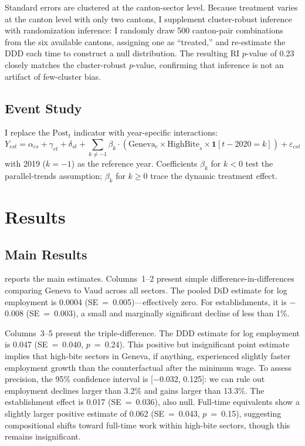 \documentclass[12pt]{article}
\begin{document}
Standard errors are clustered at the canton-sector level. Because treatment varies at the canton level with only two cantons, I supplement cluster-robust inference with randomization inference: I randomly draw 500 canton-pair combinations from the six available cantons, assigning one as ``treated,'' and re-estimate the DDD each time to construct a null distribution. The resulting RI $p$-value of 0.23 closely matches the cluster-robust $p$-value, confirming that inference is not an artifact of few-cluster bias.

\subsection{Event Study}

I replace the $\text{Post}_t$ indicator with year-specific interactions:
\begin{equation}
Y_{cst} = \alpha_{cs} + \gamma_{ct} + \delta_{st} + \sum_{k \neq -1} \beta_k \cdot (\text{Geneva}_c \times \text{HighBite}_s \times \mathbf{1}[t - 2020 = k]) + \varepsilon_{cst}
\end{equation}
with 2019 ($k = -1$) as the reference year. Coefficients $\beta_k$ for $k < 0$ test the parallel-trends assumption; $\beta_k$ for $k \geq 0$ trace the dynamic treatment effect.


\section{Results}
\label{sec:results}

\subsection{Main Results}



 reports the main estimates. Columns~1--2 present simple difference-in-differences comparing Geneva to Vaud across all sectors. The pooled DiD estimate for log employment is 0.0004 (SE~=~0.005)---effectively zero. For establishments, it is $-$0.008 (SE~=~0.003), a small and marginally significant decline of less than 1\%.

Columns~3--5 present the triple-difference. The DDD estimate for log employment is 0.047 (SE~=~0.040, $p$~=~0.24). This positive but insignificant point estimate implies that high-bite sectors in Geneva, if anything, experienced slightly faster employment growth than the counterfactual after the minimum wage. To assess precision, the 95\% confidence interval is [$-$0.032, 0.125]: we can rule out employment declines larger than 3.2\% and gains larger than 13.3\%. The establishment effect is 0.017 (SE~=~0.036), also null. Full-time equivalents show a slightly larger positive estimate of 0.062 (SE~=~0.043, $p$~=~0.15), suggesting compositional shifts toward full-time work within high-bite sectors, though this remains insignificant.
\end{document}

